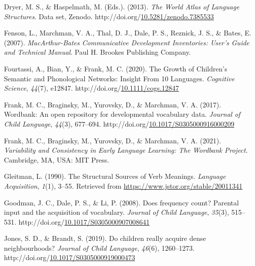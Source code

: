 \documentclass[10pt, letterpaper]{article}
\begin{document}
\begin{CSLReferences}{1}{0}
Dryer, M. S., \& Haspelmath, M. (Eds.). (2013). \emph{The {World Atlas}
of {Language Structures}}. Data set, {Zenodo}.
http://doi.org/\href{https://doi.org/10.5281/zenodo.7385533}{10.5281/zenodo.7385533}

Fenson, L., Marchman, V. A., Thal, D. J., Dale, P. S., Reznick, J. S.,
\& Bates, E. (2007). \emph{{MacArthur-Bates Communicative Development
Inventories}: {User}'s {Guide} and {Technical Manual}}. {Paul H. Brookes
Publishing Company}.

Fourtassi, A., Bian, Y., \& Frank, M. C. (2020). The {Growth} of
{Children}'s {Semantic} and {Phonological Networks}: {Insight From} 10
{Languages}. \emph{Cognitive Science}, \emph{44}(7), e12847.
http://doi.org/\href{https://doi.org/10.1111/cogs.12847}{10.1111/cogs.12847}

Frank, M. C., Braginsky, M., Yurovsky, D., \& Marchman, V. A. (2017).
Wordbank: An open repository for developmental vocabulary data.
\emph{Journal of Child Language}, \emph{44}(3), 677--694.
http://doi.org/\href{https://doi.org/10.1017/S0305000916000209}{10.1017/S0305000916000209}

Frank, M. C., Braginsky, M., Yurovsky, D., \& Marchman, V. A. (2021).
\emph{Variability and {Consistency} in {Early Language Learning}: {The
Wordbank Project}}. {Cambridge, MA, USA}: {MIT Press}.

Gleitman, L. (1990). The {Structural Sources} of {Verb Meanings}.
\emph{Language Acquisition}, \emph{1}(1), 3--55. Retrieved from
\url{https://www.jstor.org/stable/20011341}

Goodman, J. C., Dale, P. S., \& Li, P. (2008). Does frequency count?
{Parental} input and the acquisition of vocabulary. \emph{Journal of
Child Language}, \emph{35}(3), 515--531.
http://doi.org/\href{https://doi.org/10.1017/S0305000907008641}{10.1017/S0305000907008641}

Jones, S. D., \& Brandt, S. (2019). Do children really acquire dense
neighbourhoods? \emph{Journal of Child Language}, \emph{46}(6),
1260--1273.
http://doi.org/\href{https://doi.org/10.1017/S0305000919000473}{10.1017/S0305000919000473}


\end{CSLReferences}
\end{document}
